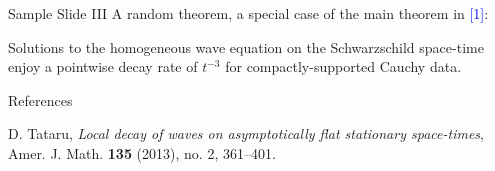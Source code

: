 \documentclass[article]{beamer}
\begin{document}
\begin{frame}{Sample Slide III}
A random theorem, a special case of the main theorem in \textcolor{blue}{[1]}:
\vspace*{.1in}

\begin{Th}
Solutions to the homogeneous wave equation on the Schwarzschild space-time enjoy a pointwise decay rate of $t^{-3}$ for compactly-supported Cauchy data.
\end{Th}

\vspace*{.1in}

{
}

\end{frame}

\begin{frame}{References}

\begin{enumerate}[label={\textcolor{blue}{[\arabic*]}}]
    \item D. Tataru, \textit{Local decay of waves on asymptotically flat stationary space-times}, Amer. J. Math. \textbf{135} (2013), no. 2, 361–401.
\end{enumerate}

\end{frame}
\end{document}
